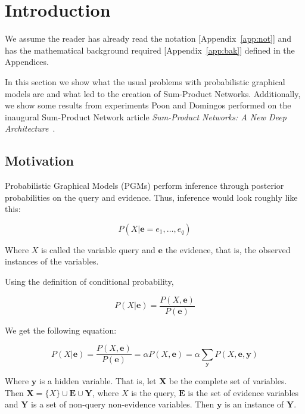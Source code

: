 \documentclass[a4paper,10pt]{article}
\theoremstyle{plain}
\begin{document}
\section{Introduction}

We assume the reader has already read the notation [Appendix~\ref{app:not}] and has the
mathematical background required [Appendix~\ref{app:bak}] defined in the Appendices.

In this section we show what the usual problems with probabilistic graphical models are and what
led to the creation of Sum-Product Networks. Additionally, we show some results from experiments
Poon and Domingos performed on the inaugural Sum-Product Network article \textit{Sum-Product
Networks: A New Deep Architecture}~\cite{poon-domingos}.

\subsection{Motivation}

Probabilistic Graphical Models (PGMs) perform inference through posterior probabilities on the
query and evidence. Thus, inference would look roughly like this:

\begin{equation*}
  P(X | \mathbf{e}=e_1,\ldots,e_q)
\end{equation*}

Where $X$ is called the variable query and $\mathbf{e}$ the evidence, that is, the observed
instances of the variables.

Using the definition of conditional probability,

\begin{equation*}
  P(X|\mathbf{e})=\frac{P(X,\mathbf{e})}{P(\mathbf{e})}
\end{equation*}

We get the following equation:

\begin{equation}
  P(X|\mathbf{e})=\frac{P(X,\mathbf{e})}{P(\mathbf{e})}=\alpha P(X,\mathbf{e})=\alpha
  \sum_{\mathbf{y}} P(X,\mathbf{e},\mathbf{y})
\end{equation}

Where $\mathbf{y}$ is a hidden variable. That is, let $\mathbf{X}$ be the complete set of
variables. Then $\mathbf{X}=\{X\} \cup \mathbf{E} \cup \mathbf{Y}$, where $X$ is the query,
$\mathbf{E}$ is the set of evidence variables and $\mathbf{Y}$ is a set of non-query non-evidence
variables. Then $\mathbf{y}$ is an instance of $\mathbf{Y}$.
\end{document}
